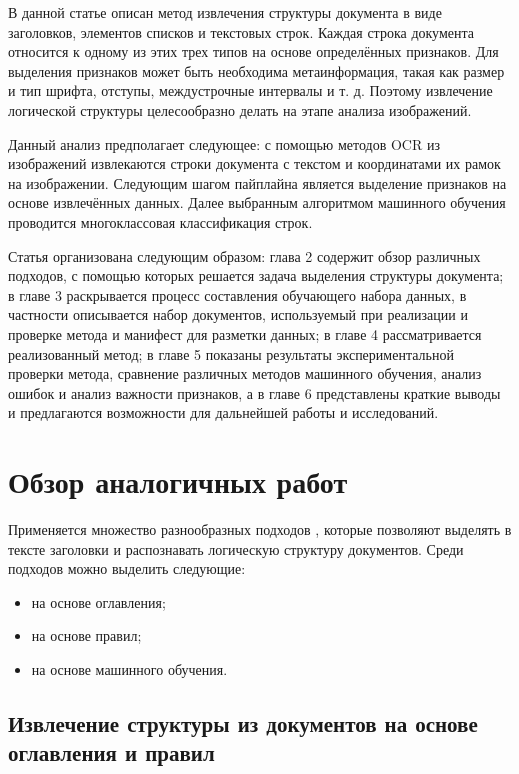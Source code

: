 \documentclass{ProcISPRAS}
\begin{document}
В данной статье описан метод извлечения структуры документа в виде заголовков, элементов списков и текстовых строк. Каждая строка документа относится к одному из этих трех типов на основе определённых признаков. Для выделения признаков может быть необходима метаинформация, такая как размер и тип шрифта, отступы, междустрочные интервалы и т. д. Поэтому извлечение логической структуры целесообразно делать на этапе анализа изображений.

Данный анализ предполагает следующее: с помощью методов OCR из изображений извлекаются строки документа с текстом и координатами их рамок на изображении. Следующим шагом пайплайна является выделение признаков на основе извлечённых данных. Далее выбранным алгоритмом машинного обучения проводится многоклассовая классификация строк.

Статья организована следующим образом:
глава 2 содержит обзор различных подходов, с помощью которых решается задача выделения структуры документа; в главе 3 раскрывается процесс составления обучающего набора данных, в частности описывается набор документов, используемый при реализации и проверке метода и манифест для разметки данных; в главе 4 рассматривается реализованный метод; в главе 5 показаны результаты экспериментальной проверки метода, сравнение различных методов машинного обучения, анализ ошибок и анализ важности признаков, а в главе 6 представлены краткие выводы и предлагаются возможности для дальнейшей работы и исследований.

\section{Обзор аналогичных работ}

Применяется множество разнообразных подходов \cite{fintoc19daniel, fintoc19tian, deep}, которые позволяют выделять в тексте заголовки и распознавать логическую структуру документов.
Среди подходов можно выделить следующие:
\begin{itemize}
\item на основе оглавления;
\item на основе правил;
\item на основе машинного обучения.
\end{itemize}

\subsection{Извлечение структуры из документов на основе оглавления и правил}
\end{document}
